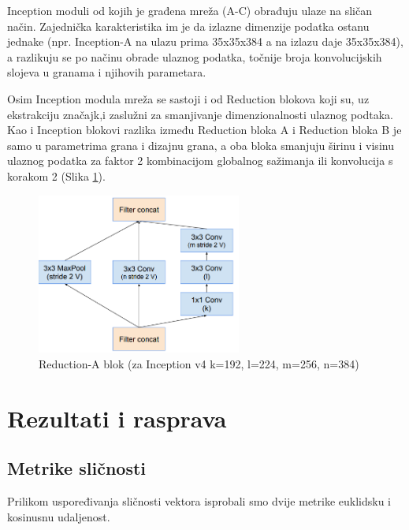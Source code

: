 \documentclass[times, utf8, proizvoljni, numeric]{fer}
\begin{document}
Inception moduli od kojih je građena mreža (A-C) obrađuju ulaze na sličan način. Zajednička karakteristika im je da izlazne dimenzije podatka ostanu jednake (npr. Inception-A na ulazu prima 35x35x384 a na izlazu daje 35x35x384), a razlikuju se po načinu obrade ulaznog podatka, točnije broja konvolucijskih slojeva u granama i njihovih parametara.

Osim Inception modula mreža se sastoji i od Reduction blokova koji su, uz ekstrakciju značajk,i zaslužni za smanjivanje dimenzionalnosti ulaznog podtaka. Kao i Inception blokovi razlika između Reduction bloka A i Reduction bloka B je samo u parametrima grana i dizajnu grana, a oba bloka smanjuju širinu i visinu ulaznog podatka za faktor 2 kombinacijom globalnog sažimanja ili konvolucija s korakom 2 (Slika \ref{fg:inception_reduction_a}).

\begin{figure}[!ht]
	\begin{center}
		\captionsetup{justification=centering}
		\includegraphics[width=0.6\textwidth]{./imgs/inception_reduction_a.png}
		\caption{Reduction-A blok (za Inception v4 k=192, l=224, m=256, n=384) \cite{Inceptionv4}}
		\label{fg:inception_reduction_a}
	\end{center}
\end{figure}
\chapter{Rezultati i rasprava}

\section{Metrike sličnosti}

Prilikom uspoređivanja sličnosti vektora isprobali smo dvije metrike  euklidsku i kosinusnu udaljenost. 
\end{document}
